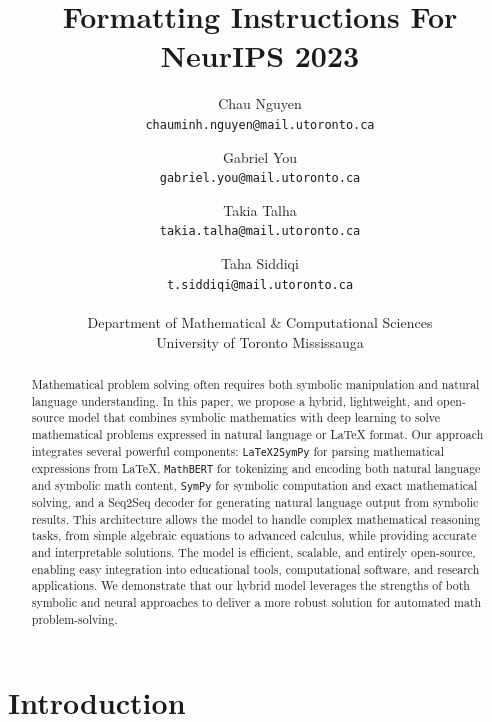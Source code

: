 \documentclass{article}
\title{Formatting Instructions For NeurIPS 2023}
\author{%
    Chau Nguyen \\
    \texttt{chauminh.nguyen@mail.utoronto.ca} \\
    \and
    Gabriel You \\
    \texttt{gabriel.you@mail.utoronto.ca} \\
    \and
    Takia Talha \\
    \texttt{takia.talha@mail.utoronto.ca} \\
    \and
    Taha Siddiqi \\
    \texttt{t.siddiqi@mail.utoronto.ca} \\
    \\
    Department of Mathematical \& Computational Sciences \\
    University of Toronto Mississauga
}
\begin{document}
\maketitle


\begin{abstract}


  Mathematical problem solving often requires both symbolic manipulation and natural language understanding. In this paper, we propose a hybrid, lightweight, and open-source model that combines symbolic mathematics with deep learning to solve mathematical problems expressed in natural language or LaTeX format. Our approach integrates several powerful components: \texttt{LaTeX2SymPy} for parsing mathematical expressions from LaTeX, \texttt{MathBERT} for tokenizing and encoding both natural language and symbolic math content, \texttt{SymPy} for symbolic computation and exact mathematical solving, and a Seq2Seq decoder for generating natural language output from symbolic results. This architecture allows the model to handle complex mathematical reasoning tasks, from simple algebraic equations to advanced calculus, while providing accurate and interpretable solutions. The model is efficient, scalable, and entirely open-source, enabling easy integration into educational tools, computational software, and research applications. We demonstrate that our hybrid model leverages the strengths of both symbolic and neural approaches to deliver a more robust solution for automated math problem-solving.
  \end{abstract}
\section{Introduction}
\end{document}
